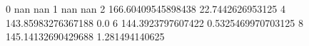 0 nan nan
1 nan nan
2 166.60409545898438 22.7442626953125
4 143.85983276367188 0.0
6 144.3923797607422 0.5325469970703125
8 145.14132690429688 1.281494140625
